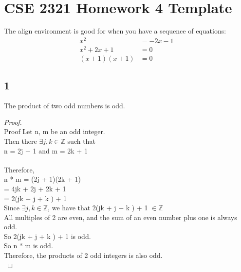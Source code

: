 \documentclass[14pt]{extarticle}
\begin{document}
\section*{CSE 2321 Homework 4 Template}

The align environment is good for when you have a sequence of equations: 
\begin{align*}
x^2 &= -2x -1 \\
x^2 +2x + 1 &= 0 \\
(x+1)(x+1) &= 0
\end{align*}


\subsection*{1}
The product of two odd numbers is odd.
\begin{proof}\hfill \\
Proof
Let n, m be an odd integer.\\
Then there $\exists j,k \in \mathbb{Z}$ such that\\
n = 2j + 1 and m = 2k + 1 \\ \\
Therefore,\\
n * m = (2j + 1)(2k + 1)\\
      = 4jk + 2j + 2k + 1 \\
      = 2(jk + j + k ) + 1 \\
      
Since $\exists j,k \in \mathbb{Z}$, we have that  2(jk + j + k ) + 1 $\in \mathbb{Z}$ \\

All multiples of 2 are even, and the sum of an even number plus one is always odd. \\
So 2(jk + j + k ) + 1 is odd. \\
So n * m is odd. \\
Therefore, the products of 2 odd integers is also odd. \\
\end{proof}
\end{document}

